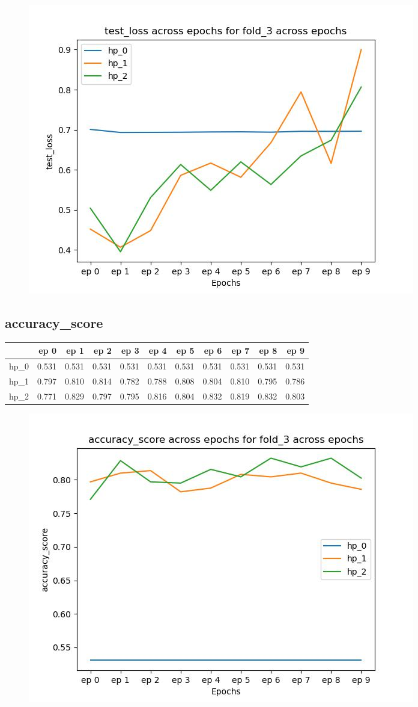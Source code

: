 \documentclass{article}
\begin{document}
\begin{figure}[H]
\includegraphics[scale = 0.75]{fold_3/test_loss}
\end{figure}
\subsection{accuracy\_score}
\begin{tabular}{lrrrrrrrrrr}
\toprule
{} &   ep 0 &   ep 1 &   ep 2 &   ep 3 &   ep 4 &   ep 5 &   ep 6 &   ep 7 &   ep 8 &   ep 9 \\
\midrule
hp\_0 &  0.531 &  0.531 &  0.531 &  0.531 &  0.531 &  0.531 &  0.531 &  0.531 &  0.531 &  0.531 \\
hp\_1 &  0.797 &  0.810 &  0.814 &  0.782 &  0.788 &  0.808 &  0.804 &  0.810 &  0.795 &  0.786 \\
hp\_2 &  0.771 &  0.829 &  0.797 &  0.795 &  0.816 &  0.804 &  0.832 &  0.819 &  0.832 &  0.803 \\
\bottomrule
\end{tabular}

\begin{figure}[H]
\includegraphics[scale = 0.75]{fold_3/accuracy_score}
\end{figure}
\end{document}
